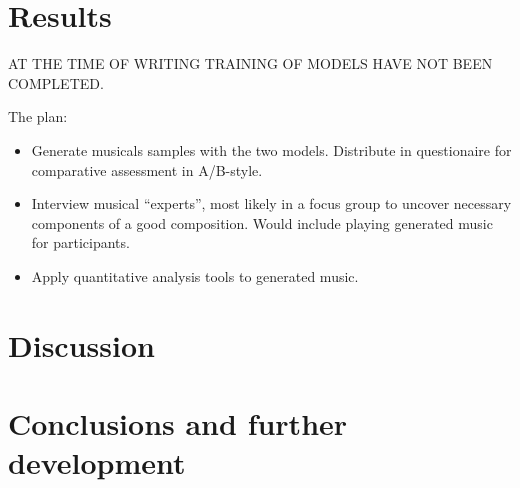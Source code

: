 \documentclass{IEEEtran}
\begin{document}
    \section{Results}
        AT THE TIME OF WRITING TRAINING OF MODELS HAVE NOT BEEN COMPLETED.

        The plan:
        \begin{itemize}
            \item Generate musicals samples with the two models. Distribute
                in questionaire for comparative assessment in A/B-style.
            \item Interview musical ``experts'', most likely in a focus group 
                to uncover necessary components of a good composition. Would 
                include playing generated music for participants.
            \item Apply quantitative analysis tools to generated music.
        \end{itemize}
            

    
    \section{Discussion}
    
    \section{Conclusions and further development}

    \vfill
    \pagebreak
    
    \printbibliography
\end{document}
